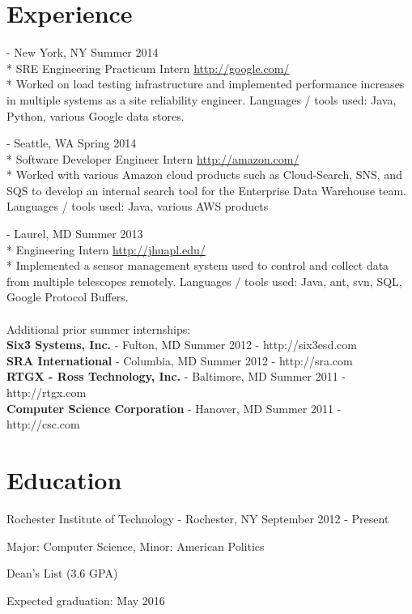 \documentclass[a4paper,margin,line]{resume}
\newcommand{\rurl}[1]{\hfill {\footnotesize \url{#1}}}
\newcommand{\rdate}[1]{\hfill {\small #1}}
\renewcommand{\employer}[5]{\item[#1] - #2 \rdate{#3} \\* #4 \rurl{#5} \\*}
\begin{document}
\begin{resume}
\section{\mysidestyle Experience}
	\begin{asparadesc}
        \employer{Google}{New York, NY}{Summer 2014}{SRE Engineering Practicum Intern}
        {http://google.com/}
		\small
        Worked on load testing infrastructure and implemented performance increases 
        in multiple systems as a site reliability engineer. Languages / tools used: 
        Java, Python, various Google data stores.
		\normalsize
		\\
		\employer{Amazon}{Seattle, WA}{Spring 2014}{Software Developer Engineer Intern}
        {http://amazon.com/}
		\small
	    Worked with various Amazon cloud products such as Cloud-Search, SNS, and SQS 
        to develop an internal search tool for the Enterprise Data Warehouse team. 
        Languages / tools used: Java, various AWS products
        \normalsize
		\\
		\employer{John Hopkins University Applied Physics Lab}{Laurel, MD}
        {Summer 2013}{Engineering Intern}{http://jhuapl.edu/}
		\small
		Implemented a sensor management system used to control and collect data from 
        multiple telescopes remotely. Languages / tools used: Java, ant, svn, SQL, 
        Google Protocol Buffers.
        \normalsize
        \\
        \\
        Additional prior summer internships:\\
        \textbf{Six3 Systems, Inc.} - Fulton, MD \hfill Summer 2012 - http://six3esd.com \\
        \textbf{SRA International} - Columbia, MD \hfill Summer 2012 - http://sra.com \\
        \textbf{RTGX - Ross Technology, Inc.} - Baltimore, MD \hfill Summer 2011 - http://rtgx.com \\
        \textbf{Computer Science Corporation} - Hanover, MD \hfill Summer 2011 - http://csc.com
    \end{asparadesc}

\section{\mysidestyle Education}
	\begin{compactdesc}
		\item[Rochester Institute of Technology] - Rochester, NY \rdate{September 2012 - Present}
		\begin{compactitem} { \small
			\item Major: Computer Science, Minor: American Politics
            \item Dean's List (3.6 GPA)
			\item Expected graduation: May 2016
		} \end{compactitem}
	\end{compactdesc}


\end{resume}
\end{document}
